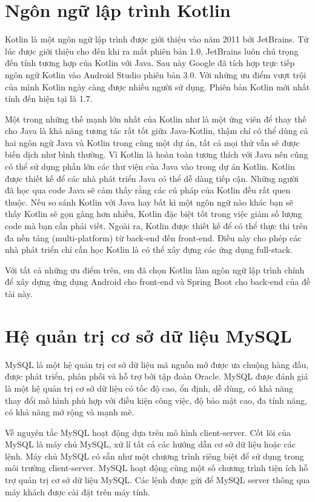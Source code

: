 \documentclass[../Main.tex]{subfiles}
\begin{document}
\section{Ngôn ngữ lập trình Kotlin}
Kotlin là một ngôn ngữ lập trình được giới thiệu vào năm 2011 bởi JetBrains\cite{Kotlin}. Từ lúc được giới thiệu cho đến khi ra mắt phiên bản 1.0, JetBrains luôn chú trọng đến tính tương hợp của Kotlin với Java. Sau này Google đã tích hợp trực tiếp ngôn ngữ Kotlin vào Android Studio phiên bản 3.0. Với những ưu điểm vượt trội của mình Kotlin ngày càng được nhiều người sử dụng. Phiên bản Kotlin mới nhất tính đến hiện tại là 1.7.

Một trong những thế mạnh lớn nhất của Kotlin như là một ứng viên để thay thế cho Java là khả năng tương tác rất tốt giữa Java-Kotlin, thậm chí có thể dùng cả hai ngôn ngữ Java và Kotlin trong cùng một dự án, tất cả mọi thứ vẫn sẽ được biến dịch như bình thường. Vì Kotlin là hoàn toàn tương thích với Java nên cũng có thể sử dụng phần lớn các thư viện của Java vào trong dự án Kotlin. Kotlin được thiết kế để các nhà phát triển Java có thể dễ dàng tiếp cận. Những người đã học qua code Java sẽ cảm thấy rằng các cú pháp của Kotlin đều rất quen thuộc. Nếu so sánh Kotlin với Java hay bất kì một ngôn ngữ nào khác bạn sẽ thấy Kotlin sẽ gọn gàng hơn nhiều, Kotlin đặc biệt tốt trong việc giảm số lượng code mà bạn cần phải viết. Ngoài ra, Kotlin được thiết kế để có thể thực thi trên đa nền tảng (multi-platform) từ back-end đến front-end. Điều này cho phép các nhà phát triển chỉ cần học Kotlin là có thể xây đựng các ứng dụng full-stack.

Với tất cả những ưu điểm trên, em đã chọn Kotlin làm ngôn ngữ lập trình chính để xây dựng ứng dụng Android cho front-end và Spring Boot cho back-end của đề tài này.

\section{Hệ quản trị cơ sở dữ liệu MySQL}
MySQL là một hệ quản trị cơ sở dữ liệu mã nguồn mở được ưa chuộng hàng đầu, được phát triển, phân phối và hỗ trợ bởi tập đoàn Oracle.
MySQL được đánh giá là một hệ quản trị cơ sở dữ liệu có tốc độ cao, ổn định, dễ dùng, có khả năng thay đổi mô hình phù hợp với điều kiện công việc, độ bảo mật cao, đa tính năng, có khả năng mở rộng và mạnh mẽ.

Về nguyên tắc MySQL hoạt động dựa trên mô hình client-server. Cốt lõi của MySQL là máy chủ MySQL, xử lí tất cả các hướng dẫn cơ sở dữ liệu hoặc các lệnh. Máy chủ MySQL có sẵn như một chương trình riêng biệt để sử dụng trong môi trường client-server. MySQL hoạt động cùng một số chương trình tiện ích hỗ trợ quản trị cơ sở dữ liệu MySQL. Các lệnh được gửi để MySQL server thông qua máy khách được cài đặt trên máy tính. 
\end{document}
